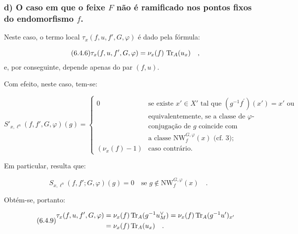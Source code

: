 \subsubsection*{d) O caso em que o feixe $F$ não é ramificado nos pontos fixos do endomorfismo $f$.}

Neste caso, o termo local $\tau_x(f,u, f', G, \varphi)$ é dado pela fórmula:

\begin{equation}\tag{6.4.6}
\tau_x(f,u, f', G, \varphi) = \nu_x(f) \, \operatorname{Tr}_A(u_x) \quad ,
\end{equation}
e, por conseguinte, depende apenas do par $(f,u)$.

Com efeito, neste caso, tem-se:

\begin{equation}\tag{6.4.7}
S'_{x,\ell^n}(f, f', G, \varphi)(g) = \begin{cases}
0 & \text{se existe } x' \in X' \text{ tal que } (g^{-1}f^{\prime})(x') = x' \text{ ou}\\
& \text{equivalentemente, se a classe de $\varphi$-}\\
& \text{conjugação de $g$ coincide com}\\
& \text{a classe } \mathrm{NW}_{f}^{G,\varphi}(x) \text{ (cf. 3); }\\
(\nu_x(f)-1) & \text{caso contrário.}
\end{cases}
\end{equation}

Em particular, resulta que:

\begin{equation}\tag{6.4.8}
S_{x,\ell^n}(f, f'; G, \varphi)(g) = 0 \quad \text{se } g \notin \mathrm{NW}_{f}^{G,\varphi}(x) \quad .
\end{equation}

Obtém-se, portanto:

\begin{equation}\tag{6.4.9}
\begin{aligned}
\tau_x(f,u, f', G, \varphi) &= \nu_x(f) \operatorname{Tr}_A(g^{-1}u_M^\vee) = \nu_x(f) \operatorname{Tr}_A(g^{-1}u')_{x'} \\
&= \nu_x(f) \operatorname{Tr}_A(u_x) \quad .
\end{aligned}
\end{equation}
